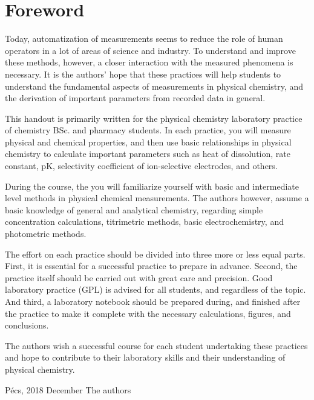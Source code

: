 \section{Foreword}

Today, automatization of measurements seems to reduce the role of human operators in a lot of areas of science and industry. To understand and improve these methods, however, a closer interaction with the measured phenomena is necessary. It is the authors' hope that these practices will help students to understand the fundamental aspects of measurements in physical chemistry, and the derivation of important parameters from recorded data in general.

This handout is primarily written for the physical chemistry laboratory practice of chemistry BSc. and pharmacy students. In each practice, you will measure physical and chemical properties, and then use basic relationships in physical chemistry to calculate important parameters such as heat of dissolution, rate constant, pK, selectivity coefficient of ion-selective electrodes, and others.

During the course, the you will familiarize yourself with basic and intermediate level methods in physical chemical measurements. The authors however, assume a basic knowledge of general and analytical chemistry, regarding simple concentration calculations, titrimetric methods, basic electrochemistry, and photometric methods.

The effort on each practice should be divided into three more or less equal parts. First, it is essential for a successful practice to prepare in advance. Second, the practice itself should be carried out with great care and precision. Good laboratory practice (GPL) is advised for all students, and regardless of the topic. And third, a laboratory notebook should be prepared during, and finished after the practice to make it complete with the necessary calculations, figures, and conclusions.

The authors wish a successful course for each student undertaking these practices and hope to contribute to their laboratory skills and their understanding of physical chemistry.

\vspace{2 cm}

Pécs, 2018 December \hfill The authors

